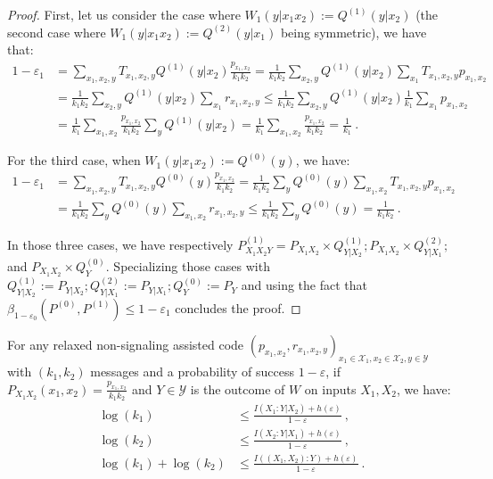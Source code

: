 \begin{proof}
  First, let us consider the case where $W_1(y|x_1x_2) := Q^{(1)}(y|x_2)$ (the second case where $W_1(y|x_1x_2) := Q^{(2)}(y|x_1)$ being symmetric), we have that:
  \begin{equation}
    \begin{aligned}
      1 - \varepsilon_1 &= \sum_{x_1,x_2,y} T_{x_1,x_2,y}Q^{(1)}(y|x_2)\frac{p_{x_1,x_2}}{k_1k_2} = \frac{1}{k_1k_2} \sum_{x_2,y} Q^{(1)}(y|x_2) \sum_{x_1}T_{x_1,x_2,y}p_{x_1,x_2}\\
      &= \frac{1}{k_1k_2}\sum_{x_2,y} Q^{(1)}(y|x_2) \sum_{x_1}r_{x_1,x_2,y} \leq \frac{1}{k_1k_2} \sum_{x_2,y} Q^{(1)}(y|x_2)\frac{1}{k_1}\sum_{x_1}p_{x_1,x_2}\\
      &= \frac{1}{k_1} \sum_{x_1,x_2}\frac{p_{x_1,x_2}}{k_1k_2}\sum_yQ^{(1)}(y|x_2) = \frac{1}{k_1}\sum_{x_1,x_2}\frac{p_{x_1,x_2}}{k_1k_2} = \frac{1}{k_1} \ .
    \end{aligned}
  \end{equation}
  
  For the third case, when $W_1(y|x_1x_2) := Q^{(0)}(y)$, we have:
  \begin{equation}
    \begin{aligned}
      1 - \varepsilon_1 &= \sum_{x_1,x_2,y} T_{x_1,x_2,y}Q^{(0)}(y)\frac{p_{x_1,x_2}}{k_1k_2} = \frac{1}{k_1k_2} \sum_{y} Q^{(0)}(y) \sum_{x_1,x_2}T_{x_1,x_2,y}p_{x_1,x_2}\\
      &= \frac{1}{k_1k_2}\sum_{y} Q^{(0)}(y) \sum_{x_1,x_2}r_{x_1,x_2,y} \leq \frac{1}{k_1k_2}\sum_{y} Q^{(0)}(y) = \frac{1}{k_1k_2} \ .
    \end{aligned}
  \end{equation}
  
  In those three cases, we have respectively $P^{(1)}_{X_1X_2Y} = P_{X_1X_2} \times Q^{(1)}_{Y|X_2}; P_{X_1X_2} \times Q^{(2)}_{Y|X_1};$ and $P_{X_1X_2} \times Q^{(0)}_{Y}$. Specializing those cases with $Q^{(1)}_{Y|X_2}:=P_{Y|X_2}; Q^{(2)}_{Y|X_1}:=P_{Y|X_1}; Q^{(0)}_{Y}:=P_Y$ and using the fact that ${\beta_{1-\varepsilon_0}\left(P^{(0)},P^{(1)}\right) \leq 1 - \varepsilon_1}$ concludes the proof.
  \end{proof}

  \begin{lemma}
    \label{lem:oneshotOB}
    For any relaxed non-signaling assisted code $(p_{x_1,x_2}, r_{x_1,x_2,y})_{x_1 \in \mathcal{X}_1,x_2 \in \mathcal{X}_2,y \in \mathcal{Y}}$ with $(k_1,k_2)$ messages and a probability of success $1-\varepsilon$, if $P_{X_1X_2}(x_1,x_2)=\frac{p_{x_1,x_2}}{k_1k_2}$ and $Y \in \mathcal{Y}$ is the outcome of $W$ on inputs $X_1,X_2$, we have:
    \begin{equation}
      \begin{aligned}
        \log(k_1) &\leq \frac{I(X_1:Y|X_2)+h(\varepsilon)}{1-\varepsilon} \ ,\\
        \log(k_2) &\leq \frac{I(X_2:Y|X_1)+h(\varepsilon)}{1-\varepsilon} \ ,\\
        \log(k_1)+\log(k_2) &\leq \frac{I((X_1,X_2):Y)+h(\varepsilon)}{1-\varepsilon} \ .
      \end{aligned}
    \end{equation}
  \end{lemma}
  
